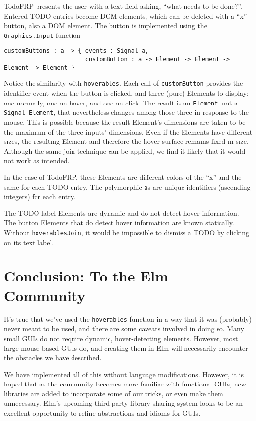 \documentclass{article}
\begin{document}
TodoFRP presents the user with a text field asking, ``what needs to be
done?''. Entered TODO entries become DOM elements, which can be deleted
with a ``x'' button, also a DOM element. The button is implemented using
the \texttt{Graphics.Input} function

\begin{verbatim}
customButtons : a -> { events : Signal a,
                       customButton : a -> Element -> Element -> Element -> Element }
\end{verbatim}

Notice the similarity with \texttt{hoverables}. Each call of
\texttt{customButton} provides the identifier event when the button is
clicked, and three (pure) Elements to display: one normally, one on
hover, and one on click. The result is an \texttt{Element}, not a
\texttt{Signal Element}, that nevertheless changes among those three in
response to the mouse. This is possible because the result Element's
dimensions are taken to be the maximum of the three inputs' dimensions.
Even if the Elements have different sizes, the resulting Element and
therefore the hover surface remains fixed in size. Although the same
join technique can be applied, we find it likely that it would not work
as intended.

In the case of TodoFRP, these Elements are different colors of the ``x''
and the same for each TODO entry. The polymorphic \texttt{a}s are unique
identifiers (ascending integers) for each entry.

The TODO label Elements are dynamic and do not detect hover information.
The button Elements that do detect hover information are known
statically. Without \texttt{hoverablesJoin}, it would be impossible to
dismiss a TODO by clicking on its text label.

\section{Conclusion: To the Elm
Community}\label{conclusion}

It's true that we've used the \texttt{hoverables} function in a way that
it was (probably) never meant to be used, and there are some caveats
involved in doing so. Many small GUIs do not require dynamic,
hover-detecting elements. However, most large mouse-based GUIs do, and
creating them in Elm will necessarily encounter the obstacles we have
described.

We have implemented all of this without language modifications. However,
it is hoped that as the community becomes more familiar with functional
GUIs, new libraries are added to incorporate some of our tricks, or even
make them unnecessary. Elm's upcoming third-party library sharing system
looks to be an excellent opportunity to refine abstractions and idioms
for GUIs.
\end{document}
